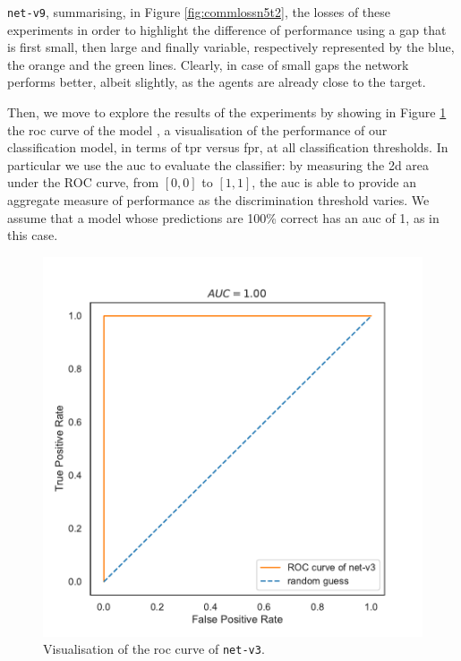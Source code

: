 \noindent
\texttt{net-v9}, summarising, in Figure \ref{fig:commlossn5t2}, the losses of 
these experiments in order to highlight the difference of performance using a gap 
that is first small, then large and finally variable, respectively represented by the 
blue, the orange and the green lines.
Clearly, in case of small gaps the network performs better, albeit slightly, as the 
agents are already close to the target.

Then, we move to explore the results of the experiments by showing in Figure 
\ref{fig:net-v3auc} the \gls{roc} curve of the model 
\cite[][]{fawcett2006introduction}, a visualisation of the performance of our 
classification model, in terms of \gls{tpr} versus \gls{fpr}, at all classification 
thresholds.
In particular we use the \gls{auc} to evaluate the classifier: by measuring the 
\gls{2d} area under the ROC curve, from $[0, 0]$ to $[1, 1]$, the \gls{auc} is able 
to provide an aggregate measure of performance as the discrimination threshold 
varies.
We assume that a model whose predictions are 100\% correct has an \gls{auc} of 
1, as in this case.
\begin{figure}[!htb]
	\centering
	\includegraphics[width=.5\textwidth]{contents/images/net-v3/roc-net-v3(a)}%
	\caption[Evaluation of the ROC of \texttt{net-v3}.]{Visualisation of the 
		\gls{roc} curve of \texttt{net-v3}.}
	\label{fig:net-v3auc}
\end{figure}

